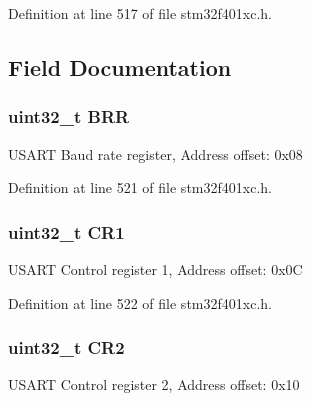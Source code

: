 Definition at line 517 of file stm32f401xc.\+h.



\subsection{Field Documentation}
\subsubsection[{\texorpdfstring{B\+RR}{BRR}}]{ uint32\+\_\+t B\+RR}\hypertarget{struct_u_s_a_r_t___type_def_a092e59d908b2ca112e31047e942340cb}{}\label{struct_u_s_a_r_t___type_def_a092e59d908b2ca112e31047e942340cb}
U\+S\+A\+RT Baud rate register, Address offset\+: 0x08 

Definition at line 521 of file stm32f401xc.\+h.

\subsubsection[{\texorpdfstring{C\+R1}{CR1}}]{ uint32\+\_\+t C\+R1}\hypertarget{struct_u_s_a_r_t___type_def_ab0ec7102960640751d44e92ddac994f0}{}\label{struct_u_s_a_r_t___type_def_ab0ec7102960640751d44e92ddac994f0}
U\+S\+A\+RT Control register 1, Address offset\+: 0x0C 

Definition at line 522 of file stm32f401xc.\+h.

\subsubsection[{\texorpdfstring{C\+R2}{CR2}}]{ uint32\+\_\+t C\+R2}\hypertarget{struct_u_s_a_r_t___type_def_afdfa307571967afb1d97943e982b6586}{}\label{struct_u_s_a_r_t___type_def_afdfa307571967afb1d97943e982b6586}
U\+S\+A\+RT Control register 2, Address offset\+: 0x10 

